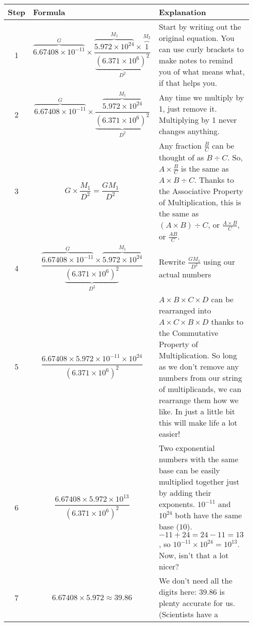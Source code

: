 \documentclass[10pt,letterpaper]{report}
\begin{document}
\begin{longtable}{| c | p{} | p{} |}
  \hline
  Step & Formula & Explanation \\
  \hline \endhead
  \rowcolor[gray]{0.95} 1 & \[ \overbrace{6.67408 \times 10^{-11}}^G \times
    \frac{\overbrace{5.972 \times 10^{24}}^{M_1}\times
      \overbrace{1}^{M_2}}{\underbrace{(6.371 \times
        10^6)^2}_{D^2}} \] & Start by writing out the
  original equation.  You can use curly brackets to make notes to
  remind you of what means what, if that helps you. \\
  \hline
  2 & \[ \overbrace{6.67408 \times 10^{-11}}^G \times
  \frac{\overbrace{5.972 \times 10^{24}}^{M_1}}{\underbrace{(6.371
      \times 10^6)^2}_{D^2}} \] & Any time we multiply by 1, just remove it.
  Multiplying by 1 never changes anything. \\
  \hline
  \rowcolor[gray]{0.95} 3 & \[
    G \times \frac{M_1}{D^2} = \frac{GM_1}{D^2} \]
  & Any fraction
  $\frac{B}{C}$ can be thought of as $B \div C$.  So, 
  $A \times \frac{B}{C}$ is the same as $A \times B \div C$.
  Thanks to the Associative Property of Multiplication, this is the same as
  $(A \times B) \div C$, or $\frac{A \times B}{C}$, or $\frac{AB}{C}$.\\
  \hline
 4 & \[ \frac{\overbrace{6.67408 \times 10^{-11}}^{G}\times\overbrace{5.972
     \times 10^{24}}^{M_{1}}}{\underbrace{(6.371 \times
     10^6)^2}_{D^2}}\] & Rewrite $\frac{GM_1}{D^2}$ using our actual
 numbers \\
 \hline
  \rowcolor[gray]{0.95} 5 & \[ \frac{6.67408 \times 5.972 \times 10^{-11} \times
    10^{24}}{(6.371 \times 10^6)^2} \] & $ A \times B \times C \times D$
  can be rearranged into $A \times C \times B \times D$ thanks to the
  Commutative Property of Multiplication.  So long as we don't remove
  any numbers from our string of multiplicands, we can rearrange them
  how we like.  In just a little bit this will make life a lot easier!
  \\
  \hline
  6 & \[ \frac{6.67408 \times 5.972 \times 10^{13}}{(6.371\times10^6)^2}\] &
  Two exponential numbers with the same base can be
  easily multiplied together just by adding their exponents.
  $10^{-11}$ and $10^{24}$ both have the same base ($10$).
  $-11 + 24 = 24 - 11 = 13$, so $10^{-11} \times 10^{24} = 10^{13}$.
  Now, isn't that a lot nicer? \\
  \hline
  \rowcolor[gray]{0.95} 7 & \[ 6.67408 \times 5.972 \approx 39.86 \] & We don't need all the
  digits here: $39.86$ is plenty accurate for us.  (Scientists have a

\end{longtable}
\end{document}
